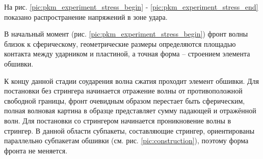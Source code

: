 \clearpage
\newpage

На рис. \ref{pic:pkm_experiment_stress_begin} - \ref{pic:pkm_experiment_stress_end} показано распространение напряжений в зоне удара.

В начальный момент (рис. \ref{pic:pkm_experiment_stress_begin}) фронт волны близок к сферическому, геометрические размеры определяются площадью контакта между ударником и пластиной, а точная форма -- строением элемента обшивки.

К концу данной стадии соударения волна сжатия проходит элемент обшивки. Для постановки без стрингера начинается отражение волны от противоположной свободной границы, фронт очевидным образом перестает быть сферическим, полная волновая картина в образце представляет сумму падающей и отражённой волн. Для постановки со стрингером начинается проникновение волны в стрингер. В данной области субпакеты, составляющие стрингер, ориентированы параллельно субпакетам обшивки (см. рис. \ref{pic:construction}), поэтому форма фронта не меняется.

